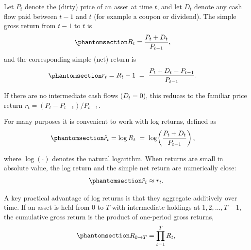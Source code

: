 \documentclass[
  letterpaper,
  DIV=11,
  numbers=noendperiod]{scrreprt}
\begin{document}
Let \(P_t\) denote the (dirty) price of an asset at time \(t\), and let
\(D_t\) denote any cash flow paid between \(t-1\) and \(t\) (for example
a coupon or dividend). The simple gross return from \(t-1\) to \(t\) is
\begin{equation}\protect\phantomsection\label{eq-gen-0017}{  
\begin{align}
    R_t &= \frac{P_t + D_t}{P_{t-1}},
\end{align}
}\end{equation} and the corresponding simple (net) return is
\begin{equation}\protect\phantomsection\label{eq-gen-0018}{  
\begin{align}
    r_t &= R_t - 1 \;=\; \frac{P_t + D_t - P_{t-1}}{P_{t-1}}.
\end{align}
}\end{equation}

If there are no intermediate cash flows (\(D_t = 0\)), this reduces to
the familiar price return \(r_t = (P_t - P_{t-1})/P_{t-1}\).

For many purposes it is convenient to work with log returns, defined as
\begin{equation}\protect\phantomsection\label{eq-gen-0019}{  
\begin{align}
    \tilde{r}_t &= \log R_t \;=\; \log\!\left(\frac{P_t + D_t}{P_{t-1}}\right),
\end{align}
}\end{equation}

where \(\log(\cdot)\) denotes the natural logarithm. When returns are
small in absolute value, the log return and the simple net return are
numerically close:
\begin{equation}\protect\phantomsection\label{eq-gen-0020}{  
\begin{align}
    \tilde{r}_t \approx r_t.
\end{align}
}\end{equation}

A key practical advantage of log returns is that they aggregate
additively over time. If an asset is held from \(0\) to \(T\) with
intermediate holdings at \(1, 2, \ldots, T-1\), the cumulative gross
return is the product of one-period gross returns,
\begin{equation}\protect\phantomsection\label{eq-gen-0021}{  
\begin{align}
    R_{0 \rightarrow T} = \prod_{t=1}^{T} R_t,
\end{align}
}\end{equation}
\end{document}
